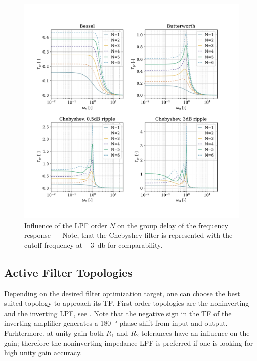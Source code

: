 {%
\begin{figure}[!htb]
  \centering
  \includegraphics[scale=0.68]{figures/electronics/lowpass/lp_filter_grd}
  \caption[Influence of the \ac{LPF} order $N$ on the group delay of the frequency response]{Influence of the \ac{LPF} order $N$ on the group delay of the frequency response --- Note, that the Chebyshev filter is represented with the cutoff frequency at \SI{-3}{\decibel} for comparability.%
  \label{fig:lp_filter_grd}}
\end{figure}
\clearpage
}

\subsection{Active Filter Topologies}
Depending on the desired filter optimization target, one can choose the best suited topology to approach its \ac{TF}. First-order topologies are the noninverting and the inverting \ac{LPF}, see . Note that the negative sign in the \ac{TF} of the inverting amplifier generates a \SI{180}{\degree} phase shift from input and output. Furhtermore, at unity gain both $R_1$ and $R_2$ tolerances have an influence on the gain; therefore the noninverting impedance \ac{LPF} is preferred if one is looking for high unity gain accuracy.

